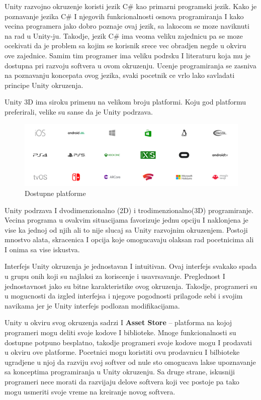 \documentclass[12pt]{article}
\begin{document}
Unity razvojno okruzenje koristi jezik C# kao primarni programski jezik.
Kako je poznavanje jezika C# I njegovih funkcionalnosti osnova programiranja I kako vecina programera jako dobro poznaje ovaj jezik, sa lakocom se moze naviknuti na rad u Unity-ju. Takodje, jezik C# ima veoma veliku zajednicu pa se moze ocekivati da je problem sa kojim se korisnik srece vec obradjen negde u okviru ove zajednice. Samim tim programer ima veliku podrsku I literaturu koja mu je dostupna pri razvoju softvera u ovom okruzenju. Ucenje programiranja se zasniva na poznavanju koncepata ovog jezika, svaki pocetnik ce vrlo lako savladati principe Unity okruzenja. 

Unity 3D ima siroku primenu na velikom broju platformi.
Koju god platformu preferirali, velike su sanse da je Unity podrzava.

\begin{figure}[ht!]
    \centering
    \includegraphics[scale=0.2]{platforme.png}
    \caption{Dostupne platforme}
\end{figure}


Unity podrzava I dvodimenzionalno (2D) i trodimenzionalno(3D) programiranje. Vecina programa u ovakvim situacijama favorizuje jednu opciju I naklonjena je vise ka jednoj od njih ali to nije slucaj sa Unity razvojnim okruzenjem. Postoji mnostvo alata, skracenica I opcija koje omogucavaju olaksan rad pocetnicima ali I onima sa vise iskustva. 

Interfejs Unity okruzenja je jednostavan I intuitivan. 
Ovaj interfejs svakako spada u grupu onih koji su najlaksi za koriscenje i usavrsavanje. Preglednost I jednostavnost jako su bitne karakteristike
ovog okruzenja. Takodje, programeri su u mogucnosti da izgled interfejsa i njegove pogodnosti prilagode sebi i svojim navikama jer je Unity interfejs
podlozan modifikacijama. 

Unity u okviru svog okruzenja sadrzi I \textbf{Asset Store} – platforma na kojoj programeri mogu deliti svoje kodove I biblioteke. Mnoge funkcionalnosti su dostupne potpuno besplatno, takodje programeri svoje kodove mogu I prodavati u okviru ove platforme. Pocetnici mogu koristiti ovu prodavnicu I bilbioteke ugradjene u njoj da razviju svoj softver od nule sto omogucava lakse upoznavanje sa konceptima programiranja u Unity okruzenju.
Sa druge strane, iskusniji programeri nece morati da razvijaju delove softvera koji vec postoje pa tako mogu usmeriti svoje vreme na kreiranje novog softvera.
\end{document}
